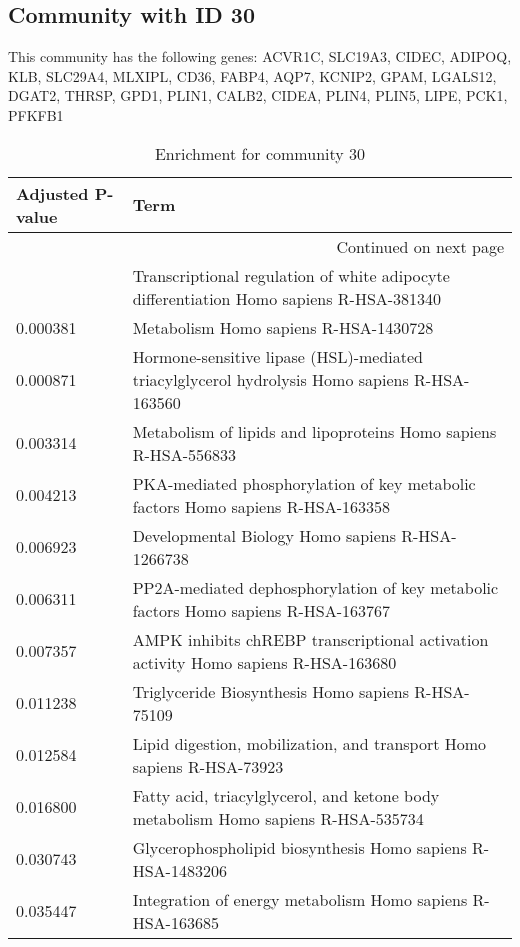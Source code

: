 \subsection*{Community with ID 30}
This community has the following genes: ACVR1C, SLC19A3, CIDEC, ADIPOQ, KLB, SLC29A4, MLXIPL, CD36, FABP4, AQP7, KCNIP2, GPAM, LGALS12, DGAT2, THRSP, GPD1, PLIN1, CALB2, CIDEA, PLIN4, PLIN5, LIPE, PCK1, PFKFB1
\\
\begin{longtable}{p{2.4cm}p{14.5cm}}
\caption{Enrichment for community 30}\\
\toprule
Adjusted \newline P-value &                                                                                          Term \\
\midrule
\endhead
\midrule
\multicolumn{2}{r}{{Continued on next page}} \\
\midrule
\endfoot

\bottomrule
\endlastfoot
                 0.000052 &       Transcriptional regulation of white adipocyte differentiation Homo sapiens R-HSA-381340 \\
                 0.000381 &                                                         Metabolism Homo sapiens R-HSA-1430728 \\
                 0.000871 &  Hormone-sensitive lipase (HSL)-mediated triacylglycerol hydrolysis Homo sapiens R-HSA-163560 \\
                 0.003314 &                               Metabolism of lipids and lipoproteins Homo sapiens R-HSA-556833 \\
                 0.004213 &               PKA-mediated phosphorylation of key metabolic factors Homo sapiens R-HSA-163358 \\
                 0.006923 &                                              Developmental Biology Homo sapiens R-HSA-1266738 \\
                 0.006311 &            PP2A-mediated dephosphorylation of key metabolic factors Homo sapiens R-HSA-163767 \\
                 0.007357 &            AMPK inhibits chREBP transcriptional activation activity Homo sapiens R-HSA-163680 \\
                 0.011238 &                                            Triglyceride Biosynthesis Homo sapiens R-HSA-75109 \\
                 0.012584 &                         Lipid digestion, mobilization, and transport Homo sapiens R-HSA-73923 \\
                 0.016800 &             Fatty acid, triacylglycerol, and ketone body metabolism Homo sapiens R-HSA-535734 \\
                 0.030743 &                                   Glycerophospholipid biosynthesis Homo sapiens R-HSA-1483206 \\
                 0.035447 &                                    Integration of energy metabolism Homo sapiens R-HSA-163685 \\
\end{longtable}


